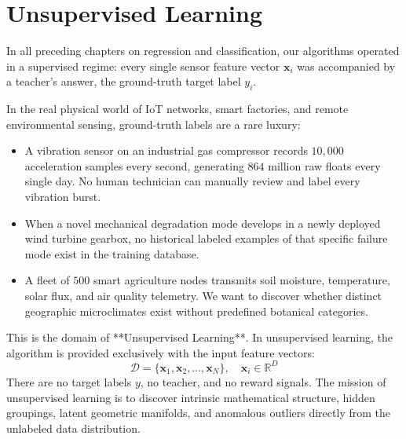 \section{Unsupervised Learning}\label{sec:unsupervised_learning}

In all preceding chapters on regression and classification, our algorithms operated in a supervised regime: every single sensor feature vector $\mathbf{x}_i$ was accompanied by a teacher's answer, the ground-truth target label $y_i$.

In the real physical world of IoT networks, smart factories, and remote environmental sensing, ground-truth labels are a rare luxury:
\begin{itemize}
    \item A vibration sensor on an industrial gas compressor records $10{,}000$ acceleration samples every second, generating $864\text{ million}$ raw floats every single day. No human technician can manually review and label every vibration burst.
    \item When a novel mechanical degradation mode develops in a newly deployed wind turbine gearbox, no historical labeled examples of that specific failure mode exist in the training database.
    \item A fleet of $500$ smart agriculture nodes transmits soil moisture, temperature, solar flux, and air quality telemetry. We want to discover whether distinct geographic microclimates exist without predefined botanical categories.
\end{itemize}

This is the domain of **Unsupervised Learning**. In unsupervised learning, the algorithm is provided exclusively with the input feature vectors:
\begin{equation}
\mathcal{D} = \{\mathbf{x}_1, \mathbf{x}_2, \dots, \mathbf{x}_N\}, \quad \mathbf{x}_i \in \mathbb{R}^D\label{eq:unsupervised_dataset}
\end{equation}
There are no target labels $y$, no teacher, and no reward signals. The mission of unsupervised learning is to discover intrinsic mathematical structure, hidden groupings, latent geometric manifolds, and anomalous outliers directly from the unlabeled data distribution.

